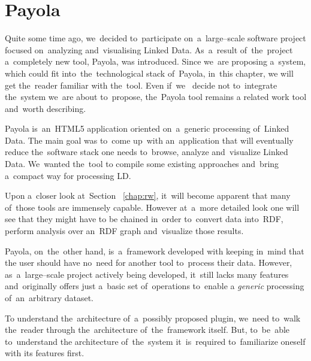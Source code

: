 \chapter{Payola}
\label{ch:payola}

Quite some time ago, we~decided to~participate on~a~large--scale software 
project focused on~analyzing and~visualising Linked Data. As~a~result of~the~project
a~completely new tool, Payola, was introduced. Since we~are proposing a~system, which could fit into~the~technological stack of~Payola, in~this chapter, 
we will get the~reader familiar with the~tool. Even if~we~ decide 
not to~integrate the~system we~are about to~propose, the~Payola tool remains
a related work tool and~worth describing.

Payola is~an~HTML5 application oriented on~a~generic processing of~Linked Data. 
The main goal was to~come up~with an~application that will eventually reduce the~software 
stack one needs to~browse, analyze and~visualize Linked Data. We~wanted the~tool 
to compile some existing approaches and~bring a~compact way for processing LD.

Upon a~closer look at~Section ~\ref{chap:rw}, it~will become apparent that many of~those tools are
immensely capable. However at~a~more detailed look one will see that they might have to
be chained in~order to~convert data into~RDF, perform analysis over an~RDF graph and~visualize those results.

Payola, on~the~other hand, is~a~framework developed with keeping in~mind that 
the user should have no~need for another tool to~process their data. However, as~a~large--scale project actively being developed, it~still lacks many 
features and~originally offers just a~basic set of~operations to~enable a
\emph{generic} processing of~an~arbitrary dataset.

To understand the~architecture of~a~possibly proposed plugin, we~need to~walk the~reader 
through the~architecture of~the~framework itself. But, to~be~able to~understand 
the architecture of~the~system it~is~required to~familiarize oneself with its features first.

